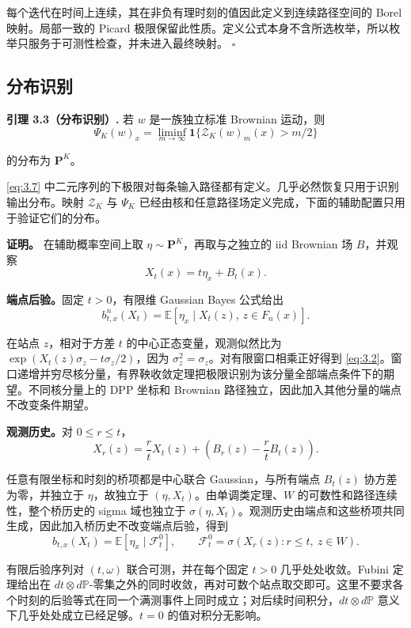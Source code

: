 \documentclass[UTF8,zihao=-4,a4paper]{ctexart}
\numberwithin{equation}{section}
\begin{document}
每个迭代在时间上连续，其在非负有理时刻的值因此定义到连续路径空间的 Borel 映射。局部一致的 Picard 极限保留此性质。定义公式本身不含所选枚举，所以枚举只服务于可测性检查，并未进入最终映射。 \(\square\)

\subsection{分布识别}

\textbf{引理 3.3（分布识别）.} 若 \(w\) 是一族独立标准 Brownian 运动，则
\[
 \Psi_K(w)_x
   =\liminf_{m\to\infty}
       \mathbf1\{\mathcal Z_K(w)_m(x)>m/2\}
 \tag{3.7}\label{eq:3.7}
\]

的分布为 \(\mathbf P^K\)。

\eqref{eq:3.7} 中二元序列的下极限对每条输入路径都有定义。几乎必然恢复只用于识别输出分布。映射 \(\mathcal Z_K\) 与 \(\Psi_K\) 已经由核和任意路径场定义完成，下面的辅助配置只用于验证它们的分布。

\textbf{证明。} 在辅助概率空间上取 \(\eta\sim\mathbf P^K\)，再取与之独立的 iid Brownian 场 \(B\)，并观察
\[
X_t(x)=t\eta_x+B_t(x).
\]


\textbf{端点后验。}固定 \(t>0\)，有限维 Gaussian Bayes 公式给出
\[
b^n_{t,x}(X_t)=\mathbb E[\eta_x\mid X_t(z),\,z\in F_n(x)].
\]

在站点 \(z\)，相对于方差 \(t\) 的中心正态变量，观测似然比为
\(\exp(X_t(z)\sigma_z-t\sigma_z/2)\)，因为 \(\sigma_z^2=\sigma_z\)。对有限窗口相乘正好得到 \eqref{eq:3.2}。窗口递增并穷尽核分量，有界鞅收敛定理把极限识别为该分量全部端点条件下的期望。不同核分量上的 DPP 坐标和 Brownian 路径独立，因此加入其他分量的端点不改变条件期望。

\textbf{观测历史。}对 \(0\le r\le t\)，
\[
 X_r(z)=\frac rt X_t(z)
          +\left(B_r(z)-\frac rt B_t(z)\right).
\]

任意有限坐标和时刻的桥项都是中心联合 Gaussian，与所有端点 \(B_t(z)\) 协方差为零，并独立于 \(\eta\)，故独立于 \((\eta,X_t)\)。由单调类定理、\(W\) 的可数性和路径连续性，整个桥历史的 sigma 域也独立于 \(\sigma(\eta,X_t)\)。观测历史由端点和这些桥项共同生成，因此加入桥历史不改变端点后验，得到
\[
 b_{t,x}(X_t)=
 \mathbb E[\eta_x\mid\mathcal F_t^0],\qquad
 \mathcal F_t^0=\sigma(X_r(z):r\le t,\ z\in W).
 \tag{3.8}\label{eq:3.8}
\]

有限后验序列对 \((t,\omega)\) 联合可测，并在每个固定 \(t>0\) 几乎处处收敛。Fubini 定理给出在 \(dt\otimes d\mathbb P\)-零集之外的同时收敛，再对可数个站点取交即可。这里不要求各个时刻的后验等式在同一个满测事件上同时成立；对后续时间积分，\(dt\otimes d\mathbb P\) 意义下几乎处处成立已经足够。\(t=0\) 的值对积分无影响。
\end{document}
